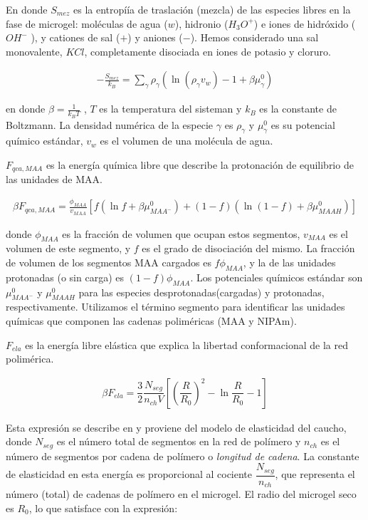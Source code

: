 \noindent En donde $S_{mez}$ es la entropí\'ia de traslaci\'on (mezcla) de las especies libres en la fase de microgel: mol\'eculas de agua ($w$), hidronio ($H_3O^+$) e iones de hidr\'oxido ($OH^-$ ), y cationes de sal ($+$) y aniones ($-$).
Hemos considerado una sal monovalente, $KCl$,  completamente disociada en iones de potasio y cloruro.

\begin{align}
-\frac{S_{mez}}{k_B}	= \sum_{\gamma} \rho_\gamma\left(\ln\left(\rho_\gamma v_w\right) -1 + \beta\mu^0_\gamma\right) 
\end{align}

\noindent en donde  $\beta=\frac{1}{k_BT}$ , $T$ es la temperatura del sisteman y  $k_B$ es la constante de Boltzmann.
La densidad num\'erica de la especie $\gamma$ es $\rho_\gamma$ y $\mu^0_\gamma$ es su potencial qu\'imico est\'andar,  $v_w$ es el volumen de una mol\'ecula de agua.

$F_{qca,MAA}$ es la energ\'ia química libre que describe la protonaci\'on de equilibrio de las unidades de MAA.


\begin{align}
	\beta F_{qca, MAA} =  \frac{\phi_{MAA}}{v_{MAA}} \left[f(\ln f+ \beta\mu^0_{MAA^-}) +(1-f)(\ln (1-f)+\beta\mu^0_{MAAH})\right]
\end{align}


\noindent donde $\phi_{MAA}$ es la fracci\'on de volumen que ocupan estos segmentos, $v_{MAA}$ es el volumen de este segmento, y $f$ es el grado de disociaci\'on del mismo. 
La fracci\'on de volumen de los segmentos MAA cargados es $f\phi_{MAA}$, y la de las unidades protonadas (o sin carga) es $(1-f)\phi_{MAA}$.
Los potenciales qu\'imicos est\'andar son $\mu^0_{MAA^-}$ y $\mu^0_{MAAH}$ para las especies desprotonadas(cargadas) y protonadas, respectivamente.
Utilizamos el t\'ermino segmento para identificar las unidades qu\'imicas que componen las cadenas polim\'ericas (MAA y NIPAm).


$F_{ela}$ es la energ\'ia libre el\'astica que explica la libertad conformacional de la red polim\'erica.

\begin{align}
	\beta F_{ela} = \dfrac{3}{2}\dfrac{N_{seg}}{n_{ch} V}\left[\left(\dfrac{R}{R_0}\right)^2 - \ln\dfrac{R}{R_0} -1\right]
\end{align}

Esta expresi\'on se describe en \cite{moncho-jorda2016a} y proviene del modelo de elasticidad del caucho,
donde $N_{seg}$ es el n\'umero total de segmentos en la red de pol\'imero y $n_{ch}$ es el n\'umero de segmentos por cadena de pol\'imero o \emph{longitud de cadena}.
La constante de elasticidad en esta energ\'ia es proporcional al cociente $\dfrac{N_{seg}}{n_{ch}}$, que representa el n\'umero (total) de cadenas de pol\'imero en el microgel.
El radio del microgel seco es $R_0$, lo que satisface con la expresi\'on:

